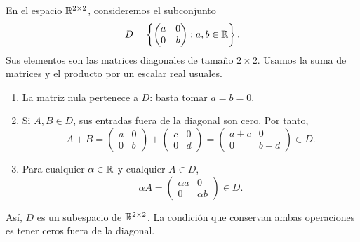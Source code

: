 \documentclass[compacto,10pt]{pubciencias-notas}
\begin{document}
\begin{ejem}\label{sem06cl01:matrices}
    En el espacio $\Mat[\R]{2}{2}$, consideremos el subconjunto
    \[
        D=\left\{\begin{pmatrix}a&0\\0&b\end{pmatrix}:a,b\in\R\right\}.
    \]
    Sus elementos son las matrices diagonales de tamaño $2\times2$.
    Usamos la suma de matrices y el producto por un escalar real usuales.
    \begin{enumerate}
        \item La matriz nula pertenece a $D$: basta tomar $a=b=0$.
        \item Si $A,B\in D$, sus entradas fuera de la diagonal son cero.
              Por tanto,
              \[
                  A+B=
                  \begin{pmatrix}a&0\\0&b\end{pmatrix}
                  +\begin{pmatrix}c&0\\0&d\end{pmatrix}
                  =\begin{pmatrix}a+c&0\\0&b+d\end{pmatrix}\in D.
              \]
        \item Para cualquier $\alpha\in\R$ y cualquier $A\in D$,
              \[
                  \alpha A=\begin{pmatrix}\alpha a&0\\0&\alpha b\end{pmatrix}
                  \in D.
              \]
    \end{enumerate}
    Así, $D$ es un subespacio de $\Mat[\R]{2}{2}$. La condición que
    conservan ambas operaciones es tener ceros fuera de la diagonal.
\end{ejem}
\end{document}
